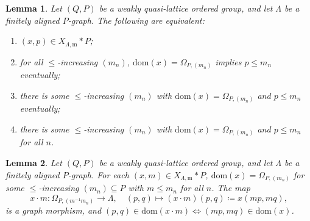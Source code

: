 \documentclass[10pt,a4paper]{amsart}
\newtheorem{lemma}{Lemma}
\newcommand{\M}{\mathrm{m}}
\newcommand{\PS}[2]{X_{#2, #1}}
\newcommand{\RPA}[2]{#1 \cdot #2}
\newcommand{\morphdom}[1]{\mathrm{dom}(#1)}
\begin{document}
\begin{lemma}
\label{lem:actionable_morphisms}
Let $(Q, P)$ be a weakly quasi-lattice ordered group, and let $\Lambda$ be a finitely aligned $P$-graph. 
The following are equivalent:
\begin{enumerate}
\item \label{actionable_1} $(x, p) \in \PS{\M}{\Lambda} * P$;
\item \label{actionable_2} for all $\leq$-increasing $(m_n)$, $\morphdom{x} = \Omega_{P, (m_n)}$ implies $p \leq m_n$ eventually;
\item \label{actionable_3} there is some $\leq$-increasing $(m_n)$ with $\morphdom{x} = \Omega_{P, (m_n)}$ and $p \leq m_n$ eventually;
\item \label{actionable_4} there is some $\leq$-increasing $(m_n)$ with $\morphdom{x} = \Omega_{P, (m_n)}$ and $p \leq m_n$ for all $n$.
\end{enumerate}
\end{lemma}

\begin{lemma}
\label{lem:action_on_PS_of_morphisms}
Let $(Q, P)$ be a weakly quasi-lattice ordered group, and let $\Lambda$ be a finitely aligned $P$-graph. 
For each $(x, m) \in \PS{\M}{\Lambda} * P$, $\morphdom{x} = \Omega_{P, (m_n)}$ for some $\leq$-increasing $(m_n) \subseteq P$ with $m \leq m_n$ for all $n$.
The map
\[
\RPA{x}{m} \colon \Omega_{P, (m^{-1}m_n)} \to \Lambda, \quad 
(p, q) \mapsto (\RPA{x}{m})(p, q) \coloneqq x(mp, mq),
\]
is a graph morphism, and $(p, q) \in \morphdom{\RPA{x}{m}} \iff (mp, mq) \in \morphdom{x}$.
\end{lemma}
\end{document}
